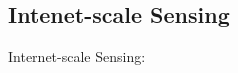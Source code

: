 \subsection{Intenet-scale Sensing}
\label{sec:iss}

Internet-scale Sensing: \cite{dependable-is-sensing}
